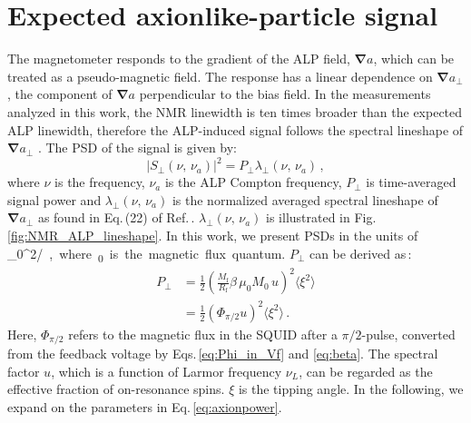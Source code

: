 \section{Expected axionlike-particle signal}\label{sec:ALPlineshape}
The magnetometer responds to the gradient of the ALP field, $\bm{\nabla} a$, which can be treated as a pseudo-magnetic field. 
The response has a linear dependence on $\bm{\nabla} a_\perp$, the component of $\bm{\nabla} a$ perpendicular to the bias field. 
In the measurements analyzed in this work, the NMR linewidth is ten times broader than the expected ALP linewidth, therefore the ALP-induced signal follows the spectral lineshape of $\bm{\nabla} a_\perp$ \cite{Yuzhe2023_FrequencyScanning}. The PSD of the signal is given by: 
\begin{equation}
    |S_{\perp}(\nu,\,\nu_a)|^2 = P_{\perp} \lambda_{\perp}(\nu,\,\nu_a)
    \,,\label{eq:Sperp}
\end{equation}
where $\nu$ is the frequency, $\nu_a$ is the ALP Compton frequency, $P_{\perp}$ is time-averaged signal power and $\lambda_{\perp}(\nu,\,\nu_a)$ is the normalized averaged spectral lineshape of $\bm{\nabla} a_\perp$ as found in Eq.\,(22) of Ref.\,\cite{Gramolin2022Feb_SpectralSignatures}. 
$\lambda_{\perp}(\nu,\,\nu_a)$ is illustrated in Fig.\,\ref{fig:NMR_ALP_lineshape}. 
In this work, we present PSDs in the units of \unit{\Phi_0^2/\Hz}, where \unit{\Phi_0} is the magnetic flux quantum.
$P_{\perp}$ can be derived as\,\cite{aybas2021_SolidStateNMR}:
\begin{align}
    \label{eq:axionpower}
    P_{\perp} &= \frac{1}{2} \left( \frac{M_\mathrm{f}}{R_\mathrm{f}}  \beta\,\mu_0 M_0\,  u \right)^2 \langle \xi^2\rangle \nonumber\\ 
    &=\frac{1}{2} \left( \Phi_{\pi/2} u \right)^2 \langle \xi^2\rangle\,.
\end{align}
Here, $\Phi_{\pi/2}$ refers to the magnetic flux in the SQUID after a $\pi/2$-pulse, converted from the feedback voltage by Eqs.\,\eqref{eq:Phi_in_Vf} and \eqref{eq:beta}. 
The spectral factor $u$, which is a function of Larmor frequency $\nu_L$, can be regarded as the effective fraction of on-resonance spins. 
$\xi$ is the tipping angle. 
In the following, we expand on the parameters in Eq.\,\eqref{eq:axionpower}. 
